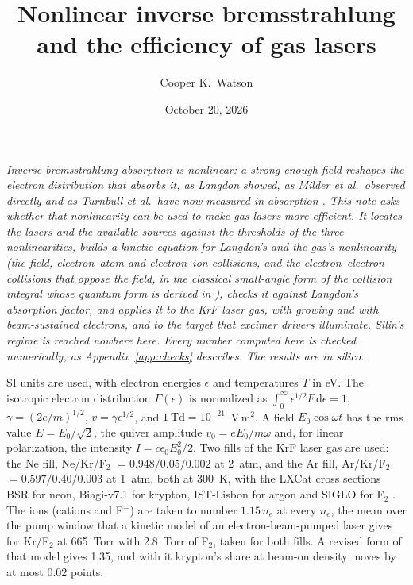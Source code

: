 \documentclass[11pt]{article}
\title{Nonlinear inverse bremsstrahlung\\ and the efficiency of gas lasers}
\author{Cooper K.\ Watson}
\date{October 20, 2026}
\numberwithin{equation}{section}
\newcommand{\dd}{\mathrm d}
\begin{document}
\maketitle

\noindent\emph{Inverse bremsstrahlung absorption is nonlinear: a strong enough field
reshapes the electron distribution that absorbs it, as Langdon showed, as Milder et
al.\ observed directly and as Turnbull et al.\ have now measured in absorption
\cite{Langdon1980,Milder2021,Turnbull2023,Turnbull2024}. This note asks whether that
nonlinearity can be used to make gas lasers more efficient. It locates the lasers
and the available sources against the thresholds of the three nonlinearities, builds
a kinetic equation for Langdon's and the gas's nonlinearity (the field, electron--atom
and electron--ion collisions, and the electron--electron collisions that oppose the
field, in the classical small-angle form of the collision integral whose quantum form
is derived in \cite{QBE}), checks it against Langdon's absorption factor, and applies
it to the KrF laser gas, with growing and with beam-sustained electrons, and to the
target that excimer drivers illuminate. Silin's regime is reached nowhere here. Every
number computed here is checked numerically, as Appendix~\ref{app:checks}
describes. The results are in silico.}

\medskip
\noindent SI units are used, with electron energies $\epsilon$ and
temperatures $T$ in eV. The isotropic electron distribution $F(\epsilon)$ is
normalized as $\int_0^\infty\epsilon^{1/2}F\,\dd\epsilon=1$, $\gamma=(2e/m)^{1/2}$,
$v=\gamma\epsilon^{1/2}$, and $1~\mathrm{Td}=10^{-21}$~V\,m$^2$. A field
$E_0\cos\omega t$ has the rms value $E=E_0/\sqrt2$, the quiver amplitude
$v_0=eE_0/m\omega$ and, for linear polarization, the intensity
$I=c\epsilon_0E_0^2/2$. Two fills of the KrF laser gas are used: the Ne fill,
Ne/Kr/F$_2$ $=0.948/0.05/0.002$ at 2~atm, and the Ar
fill, Ar/Kr/F$_2$ $=0.597/0.40/0.003$ at 1~atm, both at 300~K, with the LXCat
cross sections BSR for neon, Biagi-v7.1 for krypton,
IST-Lisbon for argon and SIGLO for F$_2$ \cite{LXCat}. The ions (cations and F$^-$)
are taken to number $1.15\,n_e$ at every $n_e$, the mean over the pump window that a
kinetic model of an electron-beam-pumped laser gives for Kr/F$_2$ at 665~Torr with
2.8~Torr of F$_2$, taken for both fills. A revised form of that model gives 1.35, and
with it krypton's share at beam-on density moves by at most 0.02 points.

\tableofcontents

\end{document}
